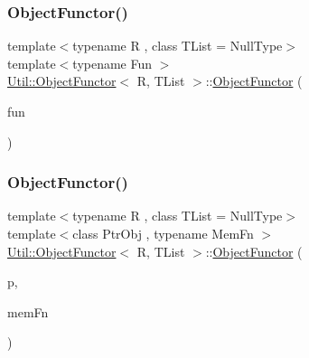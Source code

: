 \mbox{\label{classUtil_1_1ObjectFunctor_a8a0c7fe30526a774ce94c7a24af4108d}} 
\subsubsection{\texorpdfstring{ObjectFunctor()}{ObjectFunctor()}\hspace{0.1cm}{\footnotesize\ttfamily [9/15]}}
{\footnotesize\ttfamily template$<$typename R , class T\+List  = Null\+Type$>$ \\
template$<$typename Fun $>$ \\
\mbox{\hyperlink{classUtil_1_1ObjectFunctor}{Util\+::\+Object\+Functor}}$<$ R, T\+List $>$\+::\mbox{\hyperlink{classUtil_1_1ObjectFunctor}{Object\+Functor}} (\begin{DoxyParamCaption}\item[{Fun}]{fun }\end{DoxyParamCaption})\hspace{0.3cm}{\ttfamily [inline]}}

\mbox{\label{classUtil_1_1ObjectFunctor_a346fdbed7070eeafec9270c9a5a766ec}} 
\subsubsection{\texorpdfstring{ObjectFunctor()}{ObjectFunctor()}\hspace{0.1cm}{\footnotesize\ttfamily [10/15]}}
{\footnotesize\ttfamily template$<$typename R , class T\+List  = Null\+Type$>$ \\
template$<$class Ptr\+Obj , typename Mem\+Fn $>$ \\
\mbox{\hyperlink{classUtil_1_1ObjectFunctor}{Util\+::\+Object\+Functor}}$<$ R, T\+List $>$\+::\mbox{\hyperlink{classUtil_1_1ObjectFunctor}{Object\+Functor}} (\begin{DoxyParamCaption}\item[{const Ptr\+Obj \&}]{p,  }\item[{Mem\+Fn}]{mem\+Fn }\end{DoxyParamCaption})\hspace{0.3cm}{\ttfamily [inline]}}

